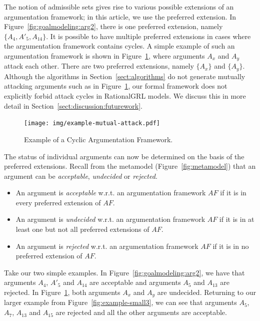 The notion of admissible sets gives rise to various possible extensions of an argumentation framework; in this article, we use the preferred extension. In Figure~\ref{fig:goalmodeling:arg2}, there is one preferred extension, namely $\{A_4, A'_5, A_{14}\}$. It is possible to have multiple preferred extensions in cases where the argumentation framework contains cycles. A simple example of such an argumentation framework is shown in Figure~\ref{fig:goalmodeling:arg3}, where arguments $A_x$ and $A_y$ attack each other. There are two preferred extensions, namely $\{A_x\}$ and $\{A_y\}$. Although the algorithms in Section~\ref{sect:algorithms} do not generate mutually attacking arguments such as in Figure~\ref{fig:goalmodeling:arg3}, our formal framework does not explicitly forbid attack cycles in RationalGRL models. We discuss this in more detail in Section~\ref{sect:discussion:futurework}.

\begin{figure}[ht]
\centering
\texttt{[image: img/example-mutual-attack.pdf]}
\caption{Example of a Cyclic Argumentation Framework.}
\label{fig:goalmodeling:arg3}
\end{figure}

The status of individual arguments can now be determined on the basis of the preferred extensions. Recall from the metamodel (Figure~\ref{fig:metamodel}) that an argument can be \emph{acceptable}, \emph{undecided} or \emph{rejected}. 

\begin{definition} 
\label{def:acceptability}
\begin{itemize}
\item An argument is \emph{acceptable} w.r.t. an argumentation framework $AF$ if it is in every preferred extension of $AF$. 
\item An argument is \emph{undecided} w.r.t. an argumentation framework $AF$ if it is in at least one but not all preferred extensions of $AF$. 
\item An argument is \emph{rejected} w.r.t. an argumentation framework $AF$ if it is in no preferred extension of $AF$. 
\end{itemize}
\end{definition}

Take our two simple examples. In Figure~\ref{fig:goalmodeling:arg2}, we have that arguments $A_4$, $A'_5$ and $A_{14}$ are acceptable and arguments $A_5$ and $A_{13}$ are rejected. In Figure~\ref{fig:goalmodeling:arg3}, both arguments $A_x$ and $A_y$ are undecided. Returning to our larger example from Figure~\ref{fig:example-small3}, we can see that arguments $A_5$, $A_7$, $A_{13}$ and $A_{15}$ are rejected and all the other arguments are acceptable.

